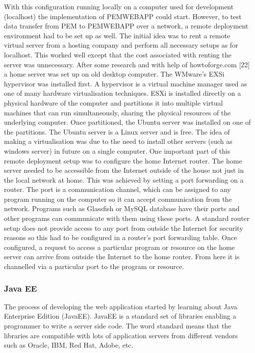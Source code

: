 \documentclass[12pt, a4paper]{report}   %
\begin{document}
\begin{enumerate}
With this configuration running locally on a computer used for development (localhost) the implementation of PEMWEBAPP could start. However, to test data transfer from PEM to PEMWEBAPP over a network, a remote deployment environment had to be set up as well. The initial idea was to rent a remote virtual server from a hosting company and perform all necessary setups as for localhost. This worked well except that the cost associated with renting the server was unnecessary. After some research and with help of howtoforge.com [22] a home server was set up on old desktop computer. The WMware's EXSi hypervisor was installed first. A hypervisor is a virtual machine manager used as one of many hardware virtualisation techniques. ESXi is installed directly on a physical hardware of the computer and partitions it into multiple virtual machines that can run simultaneously, sharing the physical resources of the underlying computer. Once partitioned, the Ubuntu server was installed on one of the partitions. The Ubuntu server is a Linux server and is free. The idea of making a virtualisation was due to the need to install other servers (such as windows server) in future on a single computer. One important part of this remote deployment setup was to configure the home Internet router. The home server needed to be accessible from the Internet outside of the house not just in the local network at home. This was achieved by setting a port forwarding on a router. The port is a communication channel, which can be assigned to any program running on the computer so it can accept communication from the network. Programs such as Glassfish or MySQL database have their ports and other programs can communicate with them using these ports. A standard router setup does not provide access to any port from outside the Internet for security reasons so this had to be configured in a router's port forwarding table. Once configured, a request to access a particular program or resource on the home server can arrive from outside the Internet to the home router. From here it is channelled via a particular port to the program or resource.

\subsubsection{Java EE}
The process of developing the web application started by learning about Java Enterprise Edition (JavaEE). JavaEE is a standard set of libraries enabling a programmer to write a server side code. The word standard means that the libraries are compatible with lots of application servers from different vendors such as Oracle, IBM, Red Hat, Adobe, etc.


\end{enumerate}
\end{document}
